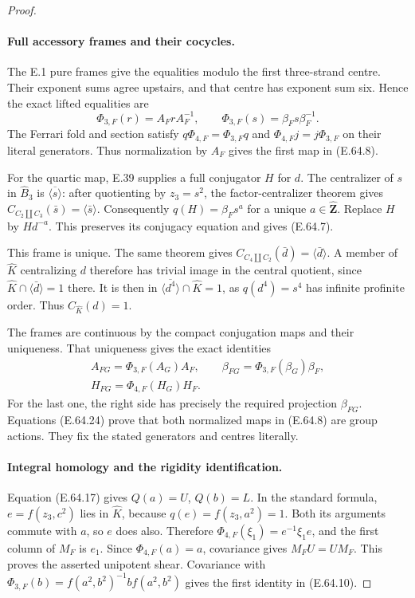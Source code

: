 \begin{proof}
\paragraph{Full accessory frames and their cocycles.}
The E.1 pure frames give the equalities modulo the first
three-strand centre.  Their exponent sums agree upstairs, and
that centre has exponent sum six.  Hence the exact lifted
equalities are
\[
 \Phi_{3,F}(r)=A_FrA_F^{-1},\qquad
 \Phi_{3,F}(s)=\beta_Fs\beta_F^{-1}.
 \tag{E.64.23}
\]
The Ferrari fold and section satisfy
$q\Phi_{4,F}=\Phi_{3,F}q$ and
$\Phi_{4,F}j=j\Phi_{3,F}$ on their literal generators.
Thus normalization by $A_F$ gives the first map in (E.64.8).

For the quartic map, E.39 supplies a full conjugator $H$ for
$d$.  The centralizer of $s$ in $\widehat B_3$ is
$\overline{\langle s\rangle}$: after quotienting by
$z_3=s^2$, the factor-centralizer theorem
\cite[Theorem B', Section 4, p.159]{BCHerfortRibes1985}
gives $C_{C_2\amalg C_3}(\bar s)=\langle\bar s\rangle$.
Consequently $q(H)=\beta_Fs^a$ for a unique
$a\in\widehat{\mathbf Z}$.  Replace $H$ by $Hd^{-a}$.
This preserves its conjugacy equation and gives (E.64.7).

This frame is unique.  The same theorem gives
$C_{C_4\amalg C_2}(\bar d)=\langle\bar d\rangle$.
A member of $\widehat K$ centralizing $d$ therefore has
trivial image in the central quotient, since
$\widehat K\cap\langle\bar d\rangle=1$ there.  It is then
in $\overline{\langle d^4\rangle}\cap\widehat K=1$, as
$q(d^4)=s^4$ has infinite profinite order.  Thus
$C_{\widehat K}(d)=1$.

The frames are continuous by the compact conjugation maps and
their uniqueness.  That uniqueness gives the exact identities
\[
 \begin{gathered}
 A_{FG}=\Phi_{3,F}(A_G)A_F,\qquad
 \beta_{FG}=\Phi_{3,F}(\beta_G)\beta_F,\\
 H_{FG}=\Phi_{4,F}(H_G)H_F.
 \end{gathered}
 \tag{E.64.24}
\]
For the last one, the right side has precisely the required
projection $\beta_{FG}$.  Equations (E.64.24) prove that both
normalized maps in (E.64.8) are group actions.  They fix the
stated generators and centres literally.

\paragraph{Integral homology and the rigidity identification.}
Equation (E.64.17) gives $Q(a)=U$, $Q(b)=L$.  In the standard
formula, $e=f(z_3,c^2)$ lies in $\widehat K$, because
$q(e)=f(z_3,a^2)=1$.  Both its arguments commute with $a$,
so $e$ does also.  Therefore
$\Phi_{4,F}(\xi_1)=e^{-1}\xi_1e$, and the first column of
$M_F$ is $e_1$.  Since $\Phi_{4,F}(a)=a$, covariance gives
$M_FU=UM_F$.  This proves the asserted unipotent shear.
Covariance with
$\Phi_{3,F}(b)=f(a^2,b^2)^{-1}bf(a^2,b^2)$ gives the
first identity in (E.64.10).


\end{proof}
